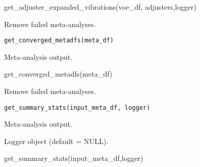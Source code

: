 \documentclass[a4paper]{book}
\begin{document}
%
\begin{Examples}
\begin{ExampleCode}
get_adjuster_expanded_vibrations(voe_df, adjusters,logger)
\end{ExampleCode}
\end{Examples}
%
\begin{Description}\relax
Remove failed meta-analyses.
\end{Description}
%
\begin{Usage}
\begin{verbatim}
get_converged_metadfs(meta_df)
\end{verbatim}
\end{Usage}
%
\begin{Arguments}
\begin{ldescription}
\item[\code{meta\_df}] Meta-analysis output.
\end{ldescription}
\end{Arguments}
%
\begin{Examples}
\begin{ExampleCode}
get_converged_metadfs(meta_df)
\end{ExampleCode}
\end{Examples}
%
\begin{Description}\relax
Remove failed meta-analyses.
\end{Description}
%
\begin{Usage}
\begin{verbatim}
get_summary_stats(input_meta_df, logger)
\end{verbatim}
\end{Usage}
%
\begin{Arguments}
\begin{ldescription}
\item[\code{input\_meta\_df}] Meta-analysis output.

\item[\code{logger}] Logger object (default = NULL).
\end{ldescription}
\end{Arguments}
%
\begin{Examples}
\begin{ExampleCode}
get_summary_stats(input_meta_df,logger)
\end{ExampleCode}
\end{Examples}
\end{document}
